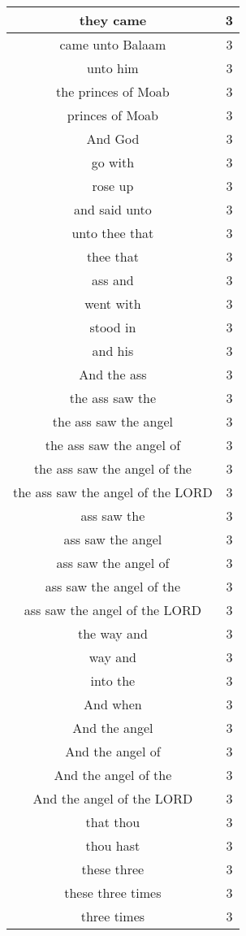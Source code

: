 \begin{center}
\begin{longtable}{|c|c|}
they came & 3\\ \hline 
came unto Balaam & 3\\ \hline 
unto him & 3\\ \hline 
the princes of Moab & 3\\ \hline 
princes of Moab & 3\\ \hline 
And God & 3\\ \hline 
go with & 3\\ \hline 
rose up & 3\\ \hline 
and said unto & 3\\ \hline 
unto thee that & 3\\ \hline 
thee that & 3\\ \hline 
ass and & 3\\ \hline 
went with & 3\\ \hline 
stood in & 3\\ \hline 
and his & 3\\ \hline 
And the ass & 3\\ \hline 
the ass saw the & 3\\ \hline 
the ass saw the angel & 3\\ \hline 
the ass saw the angel of & 3\\ \hline 
the ass saw the angel of the & 3\\ \hline 
the ass saw the angel of the LORD & 3\\ \hline 
ass saw the & 3\\ \hline 
ass saw the angel & 3\\ \hline 
ass saw the angel of & 3\\ \hline 
ass saw the angel of the & 3\\ \hline 
ass saw the angel of the LORD & 3\\ \hline 
the way and & 3\\ \hline 
way and & 3\\ \hline 
into the & 3\\ \hline 
And when & 3\\ \hline 
And the angel & 3\\ \hline 
And the angel of & 3\\ \hline 
And the angel of the & 3\\ \hline 
And the angel of the LORD & 3\\ \hline 
that thou & 3\\ \hline 
thou hast & 3\\ \hline 
these three & 3\\ \hline 
these three times & 3\\ \hline 
three times & 3\\ \hline 
\end{longtable}
\end{center}






